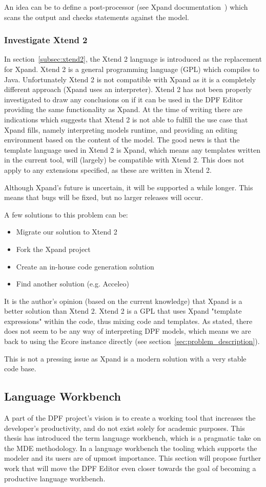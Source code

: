 An idea can be to define a post-processor (see Xpand documentation~\cite{xpand}) which scans the output and checks statements against the model.

\subsubsection{Investigate Xtend 2}
In section~\ref{subsec:xtend2}, the Xtend 2 language is introduced as the replacement for Xpand. Xtend 2 is a general programming language (GPL) which compiles to Java. Unfortunately Xtend 2 is not compatible with Xpand as it is a completely different approach (Xpand uses an interpreter). Xtend 2 has not been properly investigated to draw any conclusions on if it can be used in the DPF Editor providing the same functionality as Xpand. At the time of writing there are indications which suggests that Xtend 2 is not able to fulfill the use case that Xpand fills, namely interpreting models runtime, and providing an editing environment based on the content of the model. The good news is that the template language used in Xtend 2 is Xpand, which means any templates written in the current tool, will (largely) be compatible with Xtend 2. This does not apply to any extensions specified, as these are written in Xtend 2.

Although Xpand's future is uncertain, it will be supported a while longer. This means that bugs will be fixed, but no larger releases will occur.

A few solutions to this problem can be:
\begin{itemize}
  \item Migrate our solution to Xtend 2
  \item Fork the Xpand project
  \item Create an in-house code generation solution
  \item Find another solution (e.g. Acceleo)
\end{itemize}
It is the author's opinion (based on the current knowledge) that Xpand is a better solution than Xtend 2. Xtend 2 is a GPL that uses Xpand "template expressions" within the code, thus mixing code and templates. As stated, there does not seem to be any way of interpreting DPF models, which means we are back to using the Ecore instance directly (see section~\ref{sec:problem_description}).

This is not a pressing issue as Xpand is a modern solution with a very stable code base. 

\subsection{Language Workbench}
A part of the DPF project's vision is to create a working tool that increases the developer's productivity, and do not exist solely for academic purposes. This thesis has introduced the term language workbench, which is a pragmatic take on the MDE methodology. In a language workbench the tooling which supports the modeler and its users are of upmost importance. This section will propose further work that will move the DPF Editor even closer towards the goal of becoming a productive language workbench.

